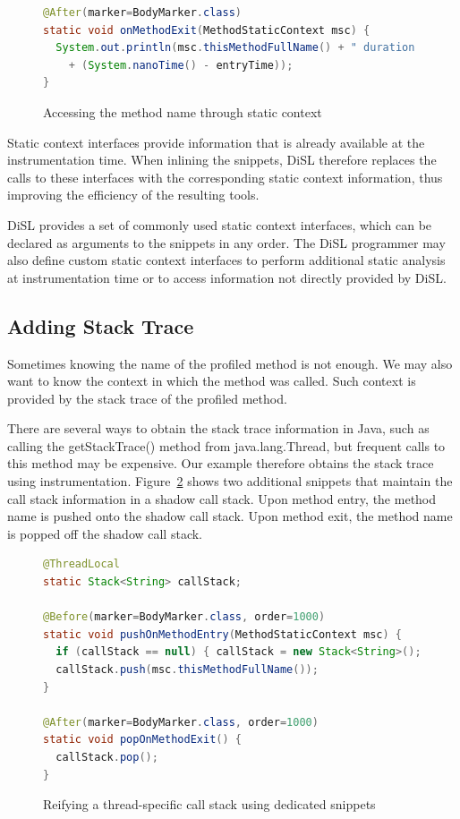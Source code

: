 \documentclass{article}
\newcommand{\brcode}[1]{\textsf{#1}}
\newcommand{\code}[1]{\mbox{\brcode{#1}}}
\begin{document}
\begin{figure}[h!]
\smaller
\begin{lstlisting}[language=Java]
@After(marker=BodyMarker.class)
static void onMethodExit(MethodStaticContext msc) {
  System.out.println(msc.thisMethodFullName() + " duration "
    + (System.nanoTime() - entryTime));
}
\end{lstlisting}
\caption{Accessing the method name through static context}
\label{fig:instr-prof-name}
\end{figure}

Static context interfaces provide information that is already available at the instrumentation time.
When inlining the snippets, DiSL therefore replaces the calls to these interfaces with the corresponding static context information, thus improving the efficiency of the resulting tools.

DiSL provides a set of commonly used static context interfaces, which can be declared as arguments to the snippets in any order.
The DiSL programmer may also define custom static context interfaces to perform additional static analysis at instrumentation time or to access information not directly provided by DiSL.


\subsection{Adding Stack Trace}

Sometimes knowing the name of the profiled method is not enough.
We may also want to know the context in which the method was called.
Such context is provided by the stack trace of the profiled method.

There are several ways to obtain the stack trace information in Java, such as calling the \code{getStackTrace()} method from \code{java.lang.Thread}, but frequent calls to this method may be expensive.
Our example therefore obtains the stack trace using instrumentation.
Figure~\ref{fig:instr-prof-cs} shows two additional snippets that maintain the call stack information in a shadow call stack.
Upon method entry, the method name is pushed onto the shadow call stack.
Upon method exit, the method name is popped off the shadow call stack.

\begin{figure}[h!]
\smaller
\begin{lstlisting}[language=Java]
@ThreadLocal
static Stack<String> callStack;

@Before(marker=BodyMarker.class, order=1000)
static void pushOnMethodEntry(MethodStaticContext msc) {
  if (callStack == null) { callStack = new Stack<String>(); }
  callStack.push(msc.thisMethodFullName());
}

@After(marker=BodyMarker.class, order=1000)
static void popOnMethodExit() {
  callStack.pop();
}
\end{lstlisting}
\caption{Reifying a thread-specific call stack using dedicated snippets}
\label{fig:instr-prof-cs}
\end{figure}
\end{document}
